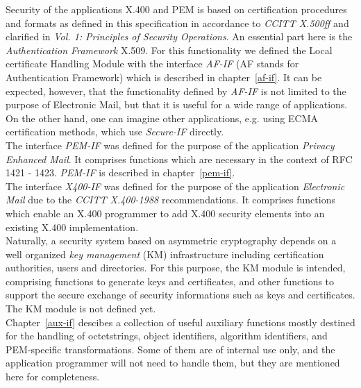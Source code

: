 Security of the applications X.400 and PEM is based on certification procedures and formats
as defined in this specification in accordance to {\em CCITT X.500ff} and clarified in
{\em Vol. 1: Principles of Security Operations}. An essential part here 
is the {\em Authentication Framework} X.509. For this functionality we defined the 
Local certificate Handling Module with the interface
{\em AF-IF} (AF stands for Authentication Framework) which is described in chapter~\ref{af-if}. 
It can be expected, however, that
the functionality defined by {\em AF-IF} is not limited to the purpose of Electronic Mail, but that
it is useful for a wide range of applications. On the other hand, one can imagine other
applications, e.g. using ECMA certification methods, which use {\em Secure-IF} directly. \\ [0.5cm]
The interface {\em PEM-IF} was defined for the purpose of the application {\em Privacy Enhanced 
Mail}. It comprises functions which are necessary in the context of RFC 1421 - 1423.
{\em PEM-IF} is described in chapter~\ref{pem-if}. 
\\ [1em]
The interface {\em X400-IF} was defined for the purpose of the application
{\em Electronic Mail} due to the {\em CCITT X.400-1988}
recommendations.
It comprises functions which enable an X.400 programmer
to add X.400 security elements into an existing X.400 implementation.
\\[1em]
Naturally, a security system based on asymmetric cryptography
depends on a well organized {\em key management} (KM) infrastructure
including certification authorities, users and directories.
For this purpose, the KM module is intended, comprising
functions to generate keys and certificates,
and other functions to support the secure exchange of security informations
such as keys and certificates. The KM module is not defined yet.
\\[1em]
Chapter~\ref{aux-if} descibes a collection of useful auxiliary functions mostly destined for the
handling of octetstrings, object identifiers, algorithm identifiers, and PEM-specific
transformations. Some of them are of internal use only, and the application programmer will
not need to handle them, but they are mentioned here for completeness.
